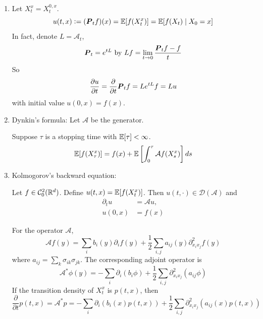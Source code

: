 \documentclass[a4paper,12pt]{article}
\begin{document}
\begin{enumerate}[label=\arabic*.]
  \item Let $X_t^x = X_t^{0,x}$.
  \begin{equation*}
    u(t,x) \vcentcolon= (\boldsymbol{P}_tf)(x) = \mathbb{E}[f(X_t^x)] = \mathbb{E}[f(X_t) \mid X_0=x]
  \end{equation*}
  In fact, denote $L =\mathcal{A}_t$,
  \begin{equation*}
    \boldsymbol{P}_t = e^{tL}~\text{by}~Lf = \lim_{t\rightarrow 0}\frac{\boldsymbol{P}_tf-f}{t}
  \end{equation*}
  So
  \begin{equation*}
    \frac{\partial u}{\partial t} = \frac{\partial }{\partial t}\boldsymbol{P}_tf = Le^{tL}f = Lu
  \end{equation*}
  with initial value $u(0,x) = f(x)$.

  \item Dynkin’s formula: Let $\mathcal{A}$ be the generator.
  \begin{thm}
    Suppose $\tau$ is a stopping time with $\mathbb{E}[\tau] < \infty$.
    \begin{equation*}
      \mathbb{E}[f(X^x_{\tau})] = f(x) + \mathbb{E}\left[\int_0^{\tau}\mathcal{A}f(X_s^x)\right]ds
    \end{equation*}
  \end{thm}

  \item Kolmogorov’s backward equation:
  \begin{thm}
    Let $f \in \mathcal{C}_0^2(\mathbb{R}^d)$. Define $u(t,x) = \mathbb{E}[f(X_t^x)]$. Then $u(t,\cdot) \in \mathcal{D}(\mathcal{A})$ and
    \begin{equation*}
      \begin{split}
        \partial_t u &= \mathcal{A}u,\\
        u(0,x) &= f(x)
      \end{split}
    \end{equation*}
  \end{thm}

  \begin{cor}
    For the operator $\mathcal{A}$,
    \begin{equation*}
      \mathcal{A}f(y) = \sum_ib_i(y)\partial_if(y)+\frac{1}{2}\sum_{i,j}a_{ij}(y)\partial^2_{x_ix_j}f(y)
    \end{equation*}
    where $a_{ij} = \sum_k\sigma_{ik}\sigma_{jk}$. The corresponding adjoint operator is
    \begin{equation*}
      \mathcal{A}^*\phi(y) = -\sum_i\partial_i(b_i\phi) + \frac{1}{2}\sum_{i,j}\partial^2_{x_ix_j}(a_{ij}\phi)
    \end{equation*}
    If the transition density of $X_t^x$ is $p(t,x)$, then
    \begin{equation*}
      \frac{\partial}{\partial t}p(t,x) = \mathcal{A}^*p =  -\sum_i\partial_i(b_i(x)p(t,x)) + \frac{1}{2}\sum_{i,j}\partial^2_{x_ix_j}(a_{ij}(x)p(t,x))
    \end{equation*}
  \end{cor}


\end{enumerate}
\end{document}
